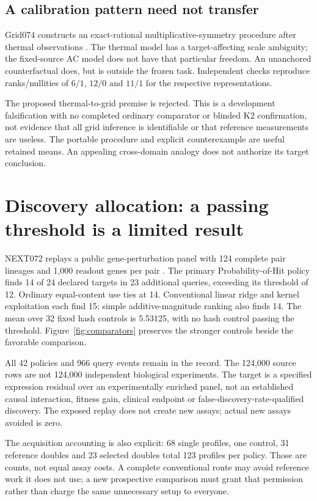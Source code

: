 \documentclass[11pt,letterpaper]{article}
\begin{document}
\subsection{A calibration pattern need not transfer}
Grid074 constructs an exact-rational multiplicative-symmetry procedure after thermal observations \cite{grid074}. The thermal model has a target-affecting scale ambiguity; the fixed-source AC model does not have that particular freedom. An unanchored counterfactual does, but is outside the frozen task. Independent checks reproduce ranks/nullities of $6/1$, $12/0$ and $11/1$ for the respective representations.

The proposed thermal-to-grid premise is rejected. This is a development falsification with no completed ordinary comparator or blinded K2 confirmation, not evidence that all grid inference is identifiable or that reference measurements are useless. The portable procedure and explicit counterexample are useful retained means. An appealing cross-domain analogy does not authorize its target conclusion.

\section{Discovery allocation: a passing threshold is a limited result}
NEXT072 replays a public gene-perturbation panel with 124 complete pair lineages and 1,000 readout genes per pair \cite{next072}. The primary Probability-of-Hit policy finds 14 of 24 declared targets in 23 additional queries, exceeding its threshold of 12. Ordinary equal-content use ties at 14. Conventional linear ridge and kernel exploitation each find 15; simple additive-magnitude ranking also finds 14. The mean over 32 fixed hash controls is 5.53125, with no hash control passing the threshold. Figure~\ref{fig:comparators} preserves the stronger controls beside the favorable comparison.

All 42 policies and 966 query events remain in the record. The 124,000 source rows are not 124,000 independent biological experiments. The target is a specified expression residual over an experimentally enriched panel, not an established causal interaction, fitness gain, clinical endpoint or false-discovery-rate-qualified discovery. The exposed replay does not create new assays; actual new assays avoided is zero.

The acquisition accounting is also explicit: 68 single profiles, one control, 31 reference doubles and 23 selected doubles total 123 profiles per policy. Those are counts, not equal assay costs. A complete conventional route may avoid reference work it does not use; a new prospective comparison must grant that permission rather than charge the same unnecessary setup to everyone.
\end{document}
